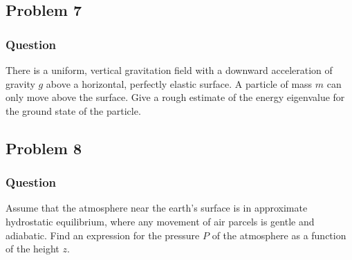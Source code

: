 \subsection{Problem 7}
\subsubsection{Question}

There is a uniform, vertical gravitation field with a downward acceleration of
gravity $g$ above a horizontal, perfectly elastic surface. A particle of mass
$m$ can only move above the surface. Give a rough estimate of the energy
eigenvalue for the ground state of the particle.



\clearpage
\subsection{Problem 8}
\subsubsection{Question}

Assume that the atmosphere near the earth's surface is in approximate
hydrostatic equilibrium, where any movement of air parcels is gentle and
adiabatic. Find an expression for the pressure $P$ of the atmosphere as a
function of the height $z$.


